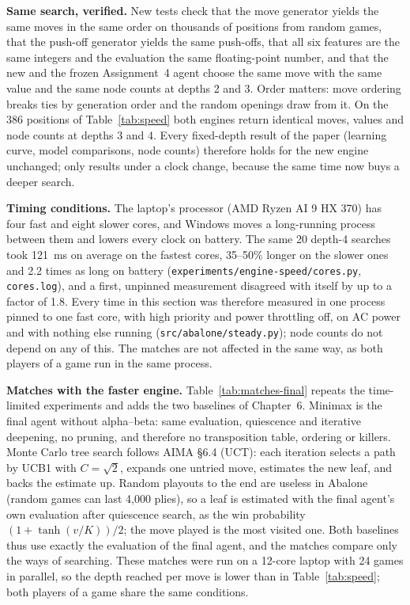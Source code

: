 \documentclass[a4paper,10pt]{article}
\begin{document}
\textbf{Same search, verified.} New tests check that the move generator yields the same moves in the same order on
thousands of positions from random games, that the push-off generator yields the same push-offs, that all six
features are the same integers and the evaluation the same floating-point number, and that the new and the frozen
Assignment~4 agent choose the same move with the same value and the same node counts at depths 2 and 3. Order
matters: move ordering breaks ties by generation order and the random openings draw from it. On the 386 positions
of Table~\ref{tab:speed} both engines return identical moves, values and node counts at depths 3 and 4. Every
fixed-depth result of the paper (learning curve, model comparisons, node counts) therefore holds for the new engine
unchanged; only results under a clock change, because the same time now buys a deeper search.

\textbf{Timing conditions.} The laptop's processor (AMD Ryzen AI 9 HX 370) has four fast and eight slower cores,
and Windows moves a long-running process between them and lowers every clock on battery. The same 20 depth-4
searches took 121~ms on average on the fastest cores, 35--50\% longer on the slower ones and 2.2 times as long on
battery (\texttt{experiments/engine-speed/cores.py}, \texttt{cores.log}), and a first, unpinned measurement
disagreed with itself by up to a factor of 1.8. Every time in this section was
therefore measured in one process pinned to one fast core, with high priority and power throttling off, on AC power
and with nothing else running (\texttt{src/abalone/steady.py}); node counts do not depend on any of this. The
matches are not affected in the same way, as both players of a game run in the same process.



\textbf{Matches with the faster engine.} Table~\ref{tab:matches-final} repeats the time-limited experiments and adds
the two baselines of Chapter~6. Minimax is the final agent without alpha--beta: same evaluation, quiescence and
iterative deepening, no pruning, and therefore no transposition table, ordering or killers. Monte Carlo tree search
follows AIMA \S6.4 (UCT): each iteration selects a path by UCB1 with $C=\sqrt2$, expands one untried move, estimates
the new leaf, and backs the estimate up. Random playouts to the end are useless in Abalone (random games can last
4,000 plies), so a leaf is estimated with the final agent's own evaluation after quiescence search, as the win
probability $(1+\tanh(v/K))/2$; the move played is the most visited one. Both baselines thus use exactly the
evaluation of the final agent, and the matches compare only the ways of searching. These matches were run on a
12-core laptop with 24 games in parallel, so the depth reached per move is lower than in Table~\ref{tab:speed}; both
players of a game share the same conditions.
\end{document}
